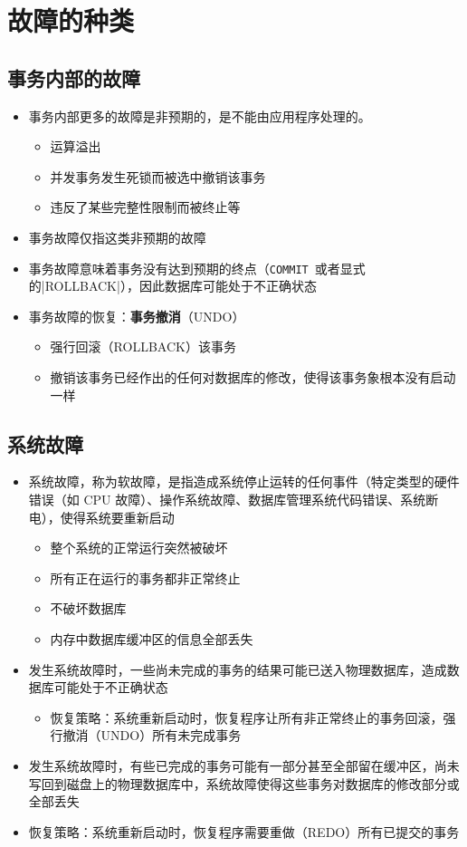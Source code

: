 \section{故障的种类}

\subsection{事务内部的故障}
\begin{itemize}
    \item 事务内部更多的故障是非预期的，是不能由应用程序处理的。
    \begin{itemize}
        \item 运算溢出
        \item 并发事务发生死锁而被选中撤销该事务
        \item 违反了某些完整性限制而被终止等
    \end{itemize}
    \item 事务故障仅指这类非预期的故障
    \item 事务故障意味着事务没有达到预期的终点（\verb|COMMIT|\ 或者显式的\sverb|ROLLBACK|），因此数据库可能处于不正确状态
    \item 事务故障的恢复：\textbf{事务撤消}（UNDO）
    \begin{itemize}
        \item 强行回滚（ROLLBACK）该事务
        \item 撤销该事务已经作出的任何对数据库的修改，使得该事务象根本没有启动一样
    \end{itemize}
\end{itemize}

\subsection{系统故障}
\begin{itemize}
    \item 系统故障，称为软故障，是指造成系统停止运转的任何事件（特定类型的硬件错误（如 CPU 故障）、操作系统故障、数据库管理系统代码错误、系统断电），使得系统要重新启动 
    \begin{itemize}
        \item 整个系统的正常运行突然被破坏
        \item 所有正在运行的事务都非正常终止
        \item 不破坏数据库
        \item 内存中数据库缓冲区的信息全部丢失
    \end{itemize}
    \item 发生系统故障时，一些尚未完成的事务的结果可能已送入物理数据库，造成数据库可能处于不正确状态
    \begin{itemize}
        \item 恢复策略：系统重新启动时，恢复程序让所有非正常终止的事务回滚，强行撤消（UNDO）所有未完成事务
    \end{itemize}
    \item 发生系统故障时，有些已完成的事务可能有一部分甚至全部留在缓冲区，尚未写回到磁盘上的物理数据库中，系统故障使得这些事务对数据库的修改部分或全部丢失
    \item 恢复策略：系统重新启动时，恢复程序需要重做（REDO）所有已提交的事务
\end{itemize}

